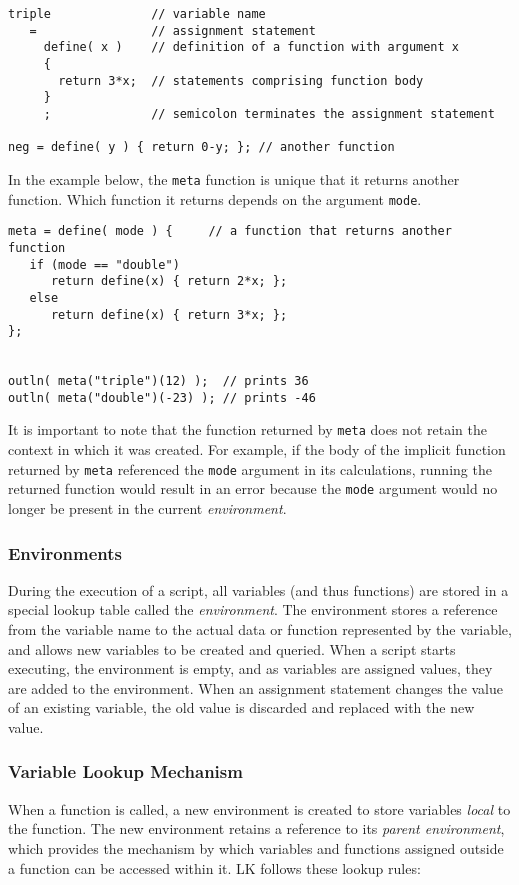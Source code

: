 \documentclass{article}
\begin{document}
\begin{verbatim}
triple              // variable name
   =                // assignment statement
     define( x )    // definition of a function with argument x
     {              
       return 3*x;  // statements comprising function body
     }        
     ;              // semicolon terminates the assignment statement
     
neg = define( y ) { return 0-y; }; // another function
\end{verbatim}

In the example below, the \texttt{meta} function is unique that it returns another function.  Which function it returns depends on the argument \texttt{mode}.

\begin{verbatim}
meta = define( mode ) {     // a function that returns another function
   if (mode == "double")
      return define(x) { return 2*x; };
   else
      return define(x) { return 3*x; };
};


outln( meta("triple")(12) );  // prints 36
outln( meta("double")(-23) ); // prints -46

\end{verbatim}

It is important to note that the function returned by \texttt{meta} does not retain the context in which it was created.  For example, if the body of the implicit function returned by \texttt{meta} referenced the \texttt{mode} argument in its calculations, running the returned function would result in an error because the \texttt{mode} argument would no longer be present in the current \emph{environment}.

\subsubsection{Environments}

During the execution of a script, all variables (and thus functions) are stored in a special lookup table called the \emph{environment}.  The environment stores a reference from the variable name to the actual data or function represented by the variable, and allows new variables to be created and queried.  When a script starts executing, the environment is empty, and as variables are assigned values, they are added to the environment.  When an assignment statement changes the value of an existing variable, the old value is discarded and replaced with the new value.

\subsubsection{Variable Lookup Mechanism}
When a function is called, a new environment is created to store variables \emph{local} to the function.  The new environment retains a reference to its \emph{parent environment}, which provides the mechanism by which variables and functions assigned outside a function can be accessed within it.  LK follows these lookup rules:
\end{document}
